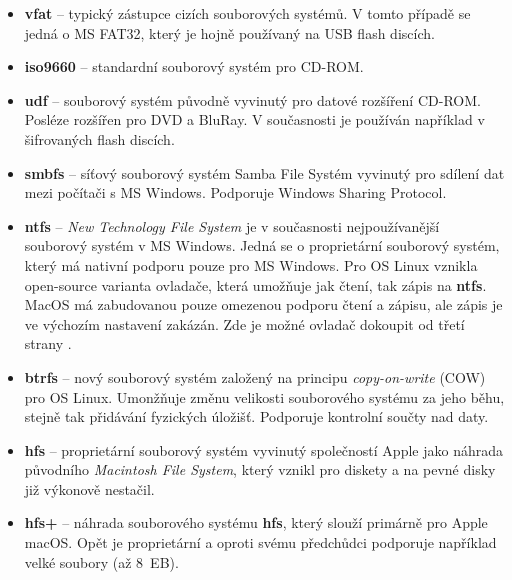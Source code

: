 \begin{itemize}
    \item \textbf{vfat} -- typický zástupce cizích souborových systémů. V tomto případě se jedná o MS FAT32, který je hojně používaný na USB flash discích.
    \item \textbf{iso9660} -- standardní souborový systém pro CD-ROM. 
    \item \textbf{udf} -- souborový systém původně vyvinutý pro datové rozšíření CD-ROM. Posléze rozšířen pro DVD a BluRay. V současnosti je používán například v šifrovaných flash discích. 
    \item \textbf{smbfs} -- síťový souborový systém Samba File Systém vyvinutý pro sdílení dat mezi počítači s MS Windows. Podporuje Windows Sharing Protocol.
    \item \textbf{ntfs} -- \textit{New Technology File System} je v současnosti nejpoužívanější souborový systém v MS Windows. Jedná se o proprietární souborový systém, který má nativní podporu pouze pro MS Windows. Pro OS Linux vznikla open-source varianta ovladače, která umožňuje jak čtení, tak zápis na \textbf{ntfs}. MacOS má zabudovanou pouze omezenou podporu čtení a zápisu, ale zápis je ve výchozím nastavení zakázán. Zde je možné ovladač dokoupit od třetí strany \cite{paragon-ntfs}.
    \item \textbf{btrfs} -- nový souborový systém založený na principu \textit{copy-on-write} (COW) pro OS Linux. Umonžňuje změnu velikosti souborového systému za jeho běhu, stejně tak přidávání fyzických úložišť. Podporuje kontrolní součty nad daty.
    \item \textbf{hfs} -- proprietární souborový systém vyvinutý společností Apple jako náhrada původního \textit{Macintosh File System}, který vznikl pro diskety a na pevné disky již výkonově nestačil.
    \item \textbf{hfs+} -- náhrada souborového systému \textbf{hfs}, který slouží primárně pro Apple macOS. Opět je proprietární a oproti svému předchůdci podporuje například velké soubory (až 8~EB).
\end{itemize}

